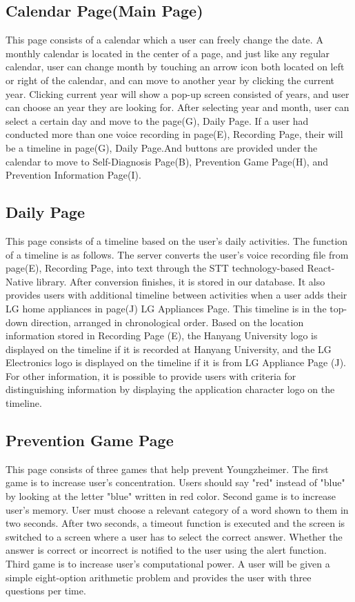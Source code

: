 \documentclass[conference]{IEEEtran}
\begin{document}
\subsection{Calendar Page(Main Page)}
This page consists of a calendar which a user can freely change the date. A monthly calendar is located in the center of a page, and just like any regular calendar, user can change month by touching an arrow icon both located on left or right of the calendar, and can move to another year by clicking the current year. Clicking current year will show a pop-up screen consisted of years, and user can choose an year they are looking for. After selecting year and month, user can select a certain day and move to the page(G), Daily Page. If a user had conducted more than one voice recording in page(E), Recording Page, their will be a timeline in page(G), Daily Page.And buttons are provided under the calendar to move to Self-Diagnosis Page(B), Prevention Game Page(H), and 
Prevention Information Page(I).
\\
\subsection{Daily Page}
This page consists of a timeline based on the user's daily activities. The function of a timeline is as follows. The server converts the user's voice recording file from page(E), Recording Page, into text through the STT technology-based React-Native library. After conversion finishes, it is stored in our database. It also provides users with additional timeline between activities when a user adds their LG home appliances in page(J) LG Appliances Page. This timeline is in the top-down direction, arranged in chronological order. Based on the location information stored in Recording Page (E), the Hanyang University logo is displayed on the timeline if it is recorded at Hanyang University, and the LG Electronics logo is displayed on the timeline if it is from LG Appliance Page (J). For other information, it is possible to provide users with criteria for distinguishing information by displaying the application character logo on the timeline.
\\
\subsection{Prevention Game Page}
This page consists of three games that help prevent Youngzheimer. The first game is to increase user's concentration. Users should say "red" instead of "blue" by looking at the letter "blue" written in  red color. Second game is to increase user's memory. User must choose a relevant category of a word shown to them in two seconds. After two seconds, a timeout function is executed and the screen is switched to a screen where a user has to select the correct answer. Whether the answer is correct or incorrect is notified to the user using the alert function. Third game is to increase user's computational power. A user will be given a simple eight-option arithmetic problem and provides the user with three questions per time.\\
\\
\end{document}
